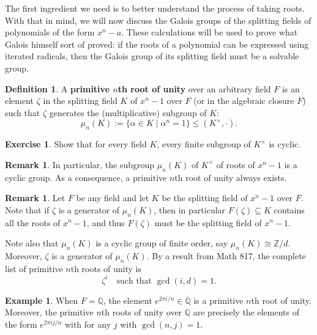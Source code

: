\documentclass[12pt]{report}
\numberwithin{equation}{section}
\numberwithin{theorem}{chapter}
\theoremstyle{definition}
\newtheorem{definition}[theorem]{Definition}
\newtheorem{example}[theorem]{Example}
\newtheorem{exercise}{Exercise}
\newtheorem*{basic properties}{Basic Properties}
\newtheorem*{Important Remark}{Important Remark}
\newtheorem{remark}[theorem]{Remark}
\newcommand{\df}[1]{{\bf #1}\index{#1}}
\begin{document}
The first ingredient we need is to better understand the process of taking roots. With that in mind, we will now discuss the Galois groups of the splitting fields of polynomials of the form $x^n - a$. These calculations will be used to prove what Galois himself sort of proved: if the roots of a polynomial can be expressed using iterated radicals, then the Galois group of its splitting field must be a solvable group.






\begin{definition}
A \df{primitive $n$th root of unity} over an arbitrary field $F$ is an element $\zeta$ in the splitting field $K$ of $x^n - 1$ over $F$ (or in the algebraic closure $\overline{F}$) such that $\zeta$ generates the (multiplicative) subgroup of $K$:
$$\mu_n(K) := \{\alpha \in K \mid \alpha^n = 1\} \leq (K^\times, \cdot).$$
\end{definition}

\begin{exercise}
	Show that for every field $K$, every finite subgroup of $K^\times$ is cyclic.
\end{exercise}


\begin{remark}
	In particular, the subgroup $\mu_n(K)$ of $K^\times$ of roots of $x^n-1$ is a cyclic group. As a consequence, a primitive $n$th root of unity always exists.
\end{remark}


\begin{remark}
Let $F$ be any field and let $K$ be the splitting field of $x^n - 1$ over $F$. Note that if $\zeta$ is a generator of $\mu_n(K)$, then in particular $F(\zeta) \subseteq K$ contains all the roots of $x^n-1$, and thus $F(\zeta)$ must be the splitting field of $x^n-1$.

Note also that $\mu_n(K)$ is a cyclic group of finite order, say $\mu_n(K) \cong \mathbb{Z}/d$. Moreover, $\zeta$ is a generator of $\mu_n(K)$. By a result from Math 817, the complete list of primitive $n$th roots of unity is 
$$\zeta^i \quad \textrm{such that } \gcd(i,d) = 1.$$
\end{remark}



\begin{example}
When $F = \mathbb{Q}$, the element $e^{2 \pi i/n} \in \overline{\mathbb{Q}}$ is a primitive $n$th root of unity. Moreover, the primitive $n$th roots of unity over $\mathbb{Q}$ are precisely the elements of the form $e^{2 \pi i j/n}$ with for any $j$ with $\gcd(n, j) = 1$.
\end{example}
\end{document}
